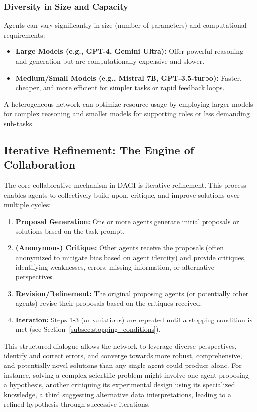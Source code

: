 \documentclass[12pt]{amsart}
\begin{document}
\subsubsection{Diversity in Size and Capacity}
Agents can vary significantly in size (number of parameters) and computational requirements:
\begin{itemize}[leftmargin=*]
    \item \textbf{Large Models (e.g., GPT-4, Gemini Ultra):} Offer powerful reasoning and generation but are computationally expensive and slower.
    \item \textbf{Medium/Small Models (e.g., Mistral 7B, GPT-3.5-turbo):} Faster, cheaper, and more efficient for simpler tasks or rapid feedback loops.
\end{itemize}
A heterogeneous network can optimize resource usage by employing larger models for complex reasoning and smaller models for supporting roles or less demanding sub-tasks.

\subsection{Iterative Refinement: The Engine of Collaboration}
The core collaborative mechanism in DAGI is iterative refinement. This process enables agents to collectively build upon, critique, and improve solutions over multiple cycles:
\begin{enumerate}
    \item \textbf{Proposal Generation:} One or more agents generate initial proposals or solutions based on the task prompt.
    \item \textbf{(Anonymous) Critique:} Other agents receive the proposals (often anonymized to mitigate bias based on agent identity) and provide critiques, identifying weaknesses, errors, missing information, or alternative perspectives.
    \item \textbf{Revision/Refinement:} The original proposing agents (or potentially other agents) revise their proposals based on the critiques received.
    \item \textbf{Iteration:} Steps 1-3 (or variations) are repeated until a stopping condition is met (see Section~\ref{subsec:stopping_conditions}).
\end{enumerate}
This structured dialogue allows the network to leverage diverse perspectives, identify and correct errors, and converge towards more robust, comprehensive, and potentially novel solutions than any single agent could produce alone. For instance, solving a complex scientific problem might involve one agent proposing a hypothesis, another critiquing its experimental design using its specialized knowledge, a third suggesting alternative data interpretations, leading to a refined hypothesis through successive iterations.
\end{document}
